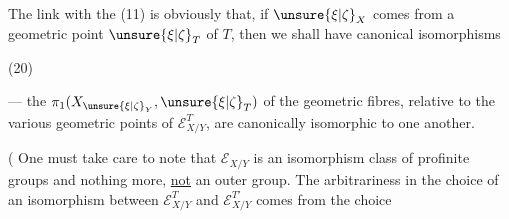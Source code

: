 
The link with the  (11) is obviously that, if $\unsure{\xi|\zeta}_X$ comes from a geometric point $\unsure{\xi|\zeta}_T$ of $T$, then we shall have canonical isomorphisms

(20)\quad
{}

 --- the $\pi_1(X_{\unsure{\xi|\zeta}_Y},\unsure{\xi|\zeta}_T)$ of the geometric fibres, relative to the various geometric points of $\mathcal E_{X/Y}^T$, are canonically isomorphic to one another.

( One must take care to note that $\mathcal E_{X/Y}$  is an isomorphism class of profinite groups and nothing more, \uline{not} an outer group. The arbitrariness in the choice of an isomorphism between $\mathcal E_{X/Y}^T$ and $\mathcal E_{X/Y}^{T'}$ comes from the choice

